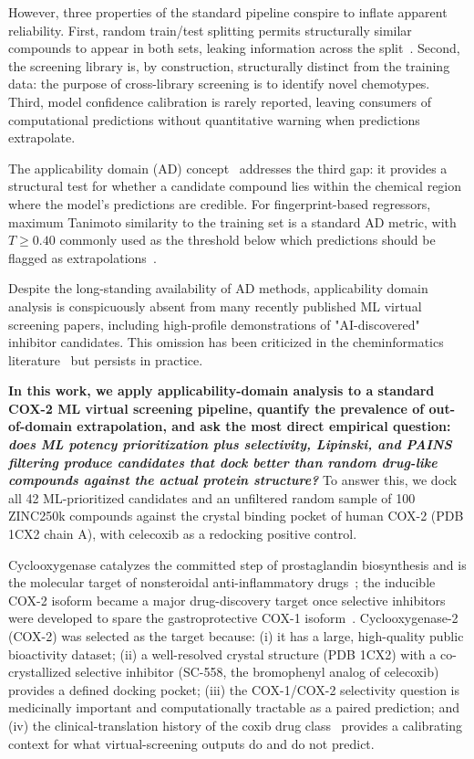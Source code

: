 \documentclass[11pt]{article}
\begin{document}
However, three properties of the standard pipeline conspire to inflate apparent reliability. First, random train/test splitting permits structurally similar compounds to appear in both sets, leaking information across the split~\cite{martin2017, sheridan2013}. Second, the screening library is, by construction, structurally distinct from the training data: the purpose of cross-library screening is to identify novel chemotypes. Third, model confidence calibration is rarely reported, leaving consumers of computational predictions without quantitative warning when predictions extrapolate.

The applicability domain (AD) concept~\cite{netzeva2005, jaworska2005} addresses the third gap: it provides a structural test for whether a candidate compound lies within the chemical region where the model's predictions are credible. For fingerprint-based regressors, maximum Tanimoto similarity to the training set is a standard AD metric, with $T \geq 0.40$ commonly used as the threshold below which predictions should be flagged as extrapolations~\cite{sheridan2004, weaver2008}.

Despite the long-standing availability of AD methods, applicability domain analysis is conspicuously absent from many recently published ML virtual screening papers, including high-profile demonstrations of "AI-discovered" inhibitor candidates. This omission has been criticized in the cheminformatics literature~\cite{walters2020, bender2021} but persists in practice.

\textbf{In this work, we apply applicability-domain analysis to a standard COX-2 ML virtual screening pipeline, quantify the prevalence of out-of-domain extrapolation, and ask the most direct empirical question: \textit{does ML potency prioritization plus selectivity, Lipinski, and PAINS filtering produce candidates that dock better than random drug-like compounds against the actual protein structure?}} To answer this, we dock all 42 ML-prioritized candidates and an unfiltered random sample of 100 ZINC250k compounds against the crystal binding pocket of human COX-2 (PDB 1CX2 chain A), with celecoxib as a redocking positive control.

Cyclooxygenase catalyzes the committed step of prostaglandin biosynthesis and is the molecular target of nonsteroidal anti-inflammatory drugs~\cite{vane1971}; the inducible COX-2 isoform became a major drug-discovery target once selective inhibitors were developed to spare the gastroprotective COX-1 isoform~\cite{hawkey1999}. Cyclooxygenase-2 (COX-2) was selected as the target because: (i) it has a large, high-quality public bioactivity dataset; (ii) a well-resolved crystal structure (PDB 1CX2) with a co-crystallized selective inhibitor (SC-558, the bromophenyl analog of celecoxib) provides a defined docking pocket; (iii) the COX-1/COX-2 selectivity question is medicinally important and computationally tractable as a paired prediction; and (iv) the clinical-translation history of the coxib drug class~\cite{bombardier2000, silverstein2000, fitzgerald2001} provides a calibrating context for what virtual-screening outputs do and do not predict.
\end{document}
